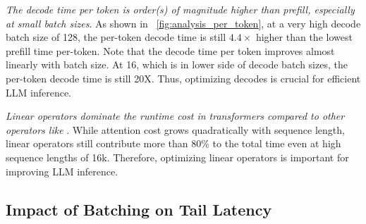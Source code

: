  \textit{The decode time per token is order(s) of magnitude higher than prefill, especially at small batch sizes}. As shown in ~\autoref{fig:analysis_per_token}, at a very high decode batch size of 128, the per-token decode time is still $4.4\times$ higher than the lowest prefill time per-token. Note that the decode time per token improves almost linearly with batch size. At 16, which is in lower side of decode batch sizes, the per-token decode time is still 20X. Thus, optimizing decodes is crucial for efficient LLM inference.


 \textit{Linear operators dominate the runtime cost in transformers compared to other operators like \attn}. While attention cost grows quadratically with sequence length, linear operators still contribute more than 80\% to the total time even at high sequence lengths of 16k. Therefore, optimizing linear operators is important for improving LLM inference.


\subsection{Impact of Batching on Tail Latency}
\label{sec:latencyandstalls}



